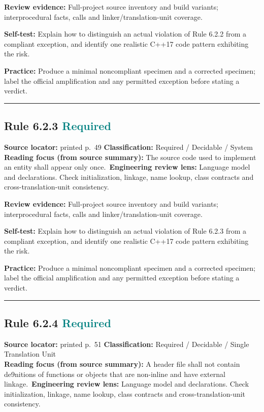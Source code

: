 \documentclass[10pt,letterpaper]{article}
\begin{document}
\textbf{Review evidence:} Full-project source inventory and build variants; interprocedural facts, calls and linker/translation-unit coverage.

\textbf{Self-test:} Explain how to distinguish an actual violation of Rule 6.2.2 from a compliant exception, and identify one realistic C++17 code pattern exhibiting the risk.\par
\textbf{Practice:} Produce a minimal noncompliant specimen and a corrected specimen; label the official amplification and any permitted exception before stating a verdict.
\smallskip\hrule\smallskip
\subsection*{Rule 6.2.3 \enspace \texorpdfstring{\small\textcolor{teal}{Required}}{Required}}
\noindent\textbf{Source locator:} printed p.~49 \quad\textbf{Classification:} Required / Decidable / System\\
\textbf{Reading focus (from source summary):} The source code used to implement an entity shall appear only once.\
\textbf{Engineering review lens:} Language model and declarations. Check initialization, linkage, name lookup, class contracts and cross-translation-unit consistency.

\textbf{Review evidence:} Full-project source inventory and build variants; interprocedural facts, calls and linker/translation-unit coverage.

\textbf{Self-test:} Explain how to distinguish an actual violation of Rule 6.2.3 from a compliant exception, and identify one realistic C++17 code pattern exhibiting the risk.\par
\textbf{Practice:} Produce a minimal noncompliant specimen and a corrected specimen; label the official amplification and any permitted exception before stating a verdict.
\smallskip\hrule\smallskip
\subsection*{Rule 6.2.4 \enspace \texorpdfstring{\small\textcolor{teal}{Required}}{Required}}
\noindent\textbf{Source locator:} printed p.~51 \quad\textbf{Classification:} Required / Decidable / Single Translation Unit\\
\textbf{Reading focus (from source summary):} A header file shall not contain de9nitions of functions or objects that are non-inline and have external linkage.\
\textbf{Engineering review lens:} Language model and declarations. Check initialization, linkage, name lookup, class contracts and cross-translation-unit consistency.
\end{document}
